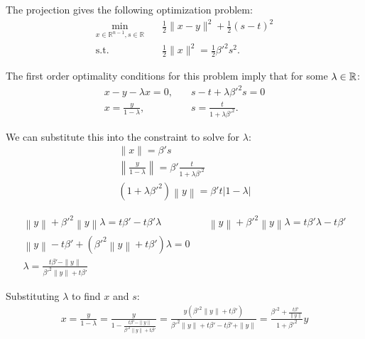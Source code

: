 The projection gives the following optimization problem:
\begin{align*}
\min_{x \in \mathbb R^{n-1}, s \in \mathbb R} & \quad \frac 1 2 \|x - y\|^2 + \frac 1 2 (s - t)^2 \\
	\textrm{s.t.}		& \quad \frac 1 2 \|x\|^2 = \frac 1 2 {\beta'}^2 s^2.
\end{align*}

%

The first order optimality conditions for this problem imply that for some $\lambda \in \mathbb R$:
\begin{align*}
x - y - \lambda x = 0, & \quad s - t + \lambda {\beta'}^2 s = 0 \\
x = \frac {y}{1 - \lambda}, & \quad s = \frac {t}{1 + \lambda {\beta'}^2 }.
\end{align*}

We can substitute this into the constraint to solve for $\lambda$:
\begin{align*}
\|x\| = {\beta'} s \\
\left\|\frac {y}{1 - \lambda}\right\| = {\beta'} \frac {t}{1 + \lambda {\beta'}^2 } \\
\left(1 + \lambda {\beta'}^2\right) \left\|y\right\| = {\beta'}  {t} \left|1 - \lambda\right|
\end{align*}

\begin{align*}
\left\|y\right\| + {\beta'}^2\left\|y\right\|\lambda = t {\beta'} - t {\beta'} \lambda          &   \quad
\left\|y\right\| + {\beta'}^2\left\|y\right\|\lambda = t {\beta'} \lambda - t {\beta'}					\\
\left\|y\right\|-t {\beta'} +\left( {\beta'}^2\left\|y\right\| + t {\beta'} \right)\lambda = 0  &		\\
\lambda = \frac{t {\beta'} - \|y\|}{{\beta'}^2\|y\| + t {\beta'}}                               &		
\end{align*}


Substituting $\lambda$ to find $x$ and $s$:
\begin{align*}
x = \frac {y}{1 - \lambda} 																		
= \frac {y}{1 - \frac{t{\beta'} - \|y\|}{{\beta'}^2\|y\| + t{\beta'}}} 									
= \frac {y\left({\beta'}^2\|y\| + t{\beta'}\right)}{{\beta'}^2\|y\| + t{\beta'} - t{\beta'} + \|y\|} 			
= \frac {{\beta'}^2 + \frac{t{\beta'}}{\|y\|}}{1 + {\beta'}^2}y 											
\end{align*}

